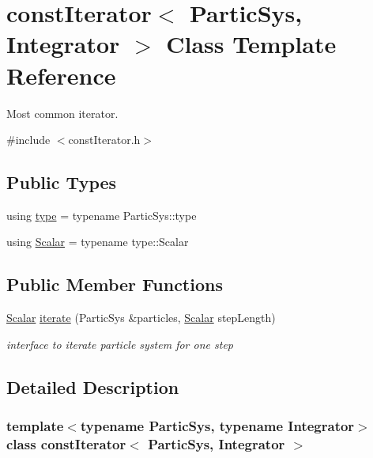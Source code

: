 \hypertarget{classconst_iterator}{}\section{const\+Iterator$<$ Partic\+Sys, Integrator $>$ Class Template Reference}
\label{classconst_iterator}


Most common iterator.  




{\ttfamily \#include $<$const\+Iterator.\+h$>$}

\subsection*{Public Types}
\begin{DoxyCompactItemize}
\item 
using \mbox{\hyperlink{classconst_iterator_aa4809910ddae08b6ffd78046ee05061e}{type}} = typename Partic\+Sys\+::type
\item 
using \mbox{\hyperlink{classconst_iterator_a524fa9110f25e60075d8ec02e5f5bb71}{Scalar}} = typename type\+::\+Scalar
\end{DoxyCompactItemize}
\subsection*{Public Member Functions}
\begin{DoxyCompactItemize}
\item 
\mbox{\hyperlink{classconst_iterator_a524fa9110f25e60075d8ec02e5f5bb71}{Scalar}} \mbox{\hyperlink{classconst_iterator_af7cdfe1f6ab00dab9942645d5306ea32}{iterate}} (Partic\+Sys \&particles, \mbox{\hyperlink{classconst_iterator_a524fa9110f25e60075d8ec02e5f5bb71}{Scalar}} step\+Length)
\begin{DoxyCompactList}\small\item\em interface to iterate particle system for one step \end{DoxyCompactList}\end{DoxyCompactItemize}


\subsection{Detailed Description}
\subsubsection*{template$<$typename Partic\+Sys, typename Integrator$>$\newline
class const\+Iterator$<$ Partic\+Sys, Integrator $>$}

